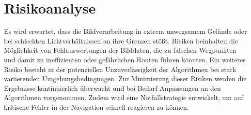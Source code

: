 \section{Risikoanalyse}

Es wird erwartet, dass die Bildverarbeitung in extrem unwegsamem Gelände oder bei schlechten Lichtverhältnissen an ihre Grenzen stößt. 
Risiken beinhalten die Möglichkeit von Fehlauswertungen der Bilddaten, die zu falschen Wegpunkten und damit zu ineffizienten oder gefährlichen Routen führen könnten. 
Ein weiteres Risiko besteht in der potenziellen Unzuverlässigkeit der Algorithmen bei stark variierenden Umgebungsbedingungen. 
Zur Minimierung dieser Risiken werden die Ergebnisse kontinuierlich überwacht und bei Bedarf Anpassungen an den Algorithmen vorgenommen. 
Zudem wird eine Notfallstrategie entwickelt, um auf kritische Fehler in der Navigation schnell reagieren zu können.